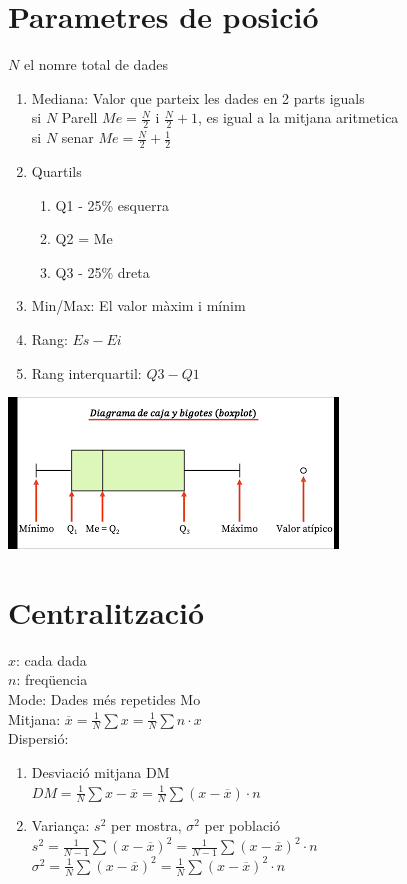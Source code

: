 \documentclass[12pt,a4paper]{article}
\begin{document}
\section{Parametres de posició}
$N$ el nomre total de dades
\begin{enumerate}[label=$\rightarrow$]
    \item Mediana: Valor que parteix les dades en 2 parts iguals\\[5pt]
        si $N$ Parell $Me=\frac{N}{2}$ i $\frac{N}{2}+1$, es igual a la mitjana aritmetica\\[5pt]
        si $N$ senar $Me=\frac{N}{2}+\frac{1}{2}$
    \item Quartils \begin{enumerate}[label=]
        \item Q1 - 25\% esquerra
        \item Q2 = Me
        \item Q3 - 25\% dreta
    \end{enumerate}
    \item Min/Max: El valor màxim i mínim
    \item Rang: $Es - Ei$
    \item Rang interquartil: $Q3 - Q1$
\end{enumerate}
\includegraphics{Imatges/descarga.png}
\section{Centralització}
$x$: cada dada\\
$n$: freqüencia\\[10pt]
Mode: Dades més repetides Mo\\
Mitjana: $\overline{x}=\frac{1}{N}\sum x=\frac{1}{N}\sum n\cdot x$\\
Dispersió:
\begin{enumerate}[label=]
    \item Desviació mitjana DM\\[5pt]
        $DM = \frac{1}{N}\sum x-\overline{x}=\frac{1}{N}\sum\left(x-\overline{x}\right)\cdot n$
    \item Variança: $s^2$ per mostra, $\sigma^2$ per població\\[5pt]
        $s^2=\frac{1}{N-1}\sum\left(x-\overline{x}\right)^2=\frac{1}{N-1}\sum\left(x-\overline{x}\right)^2\cdot n$\\[5pt]
        $\sigma^2=\frac{1}{N}\sum\left(x-\overline{x}\right)^2=\frac{1}{N}\sum\left(x-\overline{x}\right)^2\cdot n$
\end{enumerate}
\end{document}
